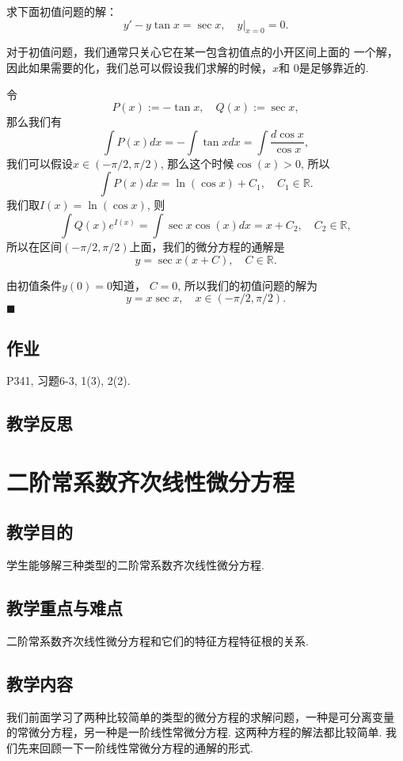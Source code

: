 \documentclass[a4paper, titlepage, twoside]{article}
\newenvironment{jie}{\noindent{\bf 解:}}{\hfill$\blacksquare$\par}
\numberwithin{equation}{section}
\begin{document}
\begin{example}[P341, 习题6-3, 2(1)]
	求下面初值问题的解：
	$$ y'-y\tan x =\sec x, \quad y|_{x=0}=0.$$
\end{example}
\begin{jie}
	对于初值问题，我们通常只关心它在某一包含初值点的小开区间上面的
	一个解，因此如果需要的化，我们总可以假设我们求解的时候，$x$和
	$0$是足够靠近的. 

	令
	$$ P(x) := -\tan x, \quad Q(x):= \sec x, $$
	那么我们有
	$$ \int P(x) dx = -\int \tan x dx = \int \frac{d\cos x}{\cos x}, $$
	我们可以假设$x\in (-\pi/2, \pi/2)$, 那么这个时候$\cos(x)>0$,  所以
	$$ \int P(x)dx=\ln(\cos x) + C_1, \quad C_1 \in \mathbb{R}.$$
	我们取$I(x)=\ln(\cos x)$, 则
	$$ \int Q(x) e^{I(x)} = \int \sec x \cos (x) dx =x + C_2, \quad C_2\in
	\mathbb{R}, $$
	所以在区间$(-\pi/2, \pi/2)$上面，我们的微分方程的通解是
	$$ y= \sec x ( x + C), \quad C\in \mathbb{R}.$$

	由初值条件$y(0)=0$知道， $C=0$, 所以我们的初值问题的解为
	$$ y=x\sec x, \quad x\in (-\pi/2, \pi/2).$$
\end{jie}

\subsection{作业}

P341, 习题6-3, 1(3), 2(2).
\subsection{教学反思}




\section{二阶常系数齐次线性微分方程}
\subsection{教学目的}
学生能够解三种类型的二阶常系数齐次线性微分方程. 
\subsection{教学重点与难点}
二阶常系数齐次线性微分方程和它们的特征方程特征根的关系. 
\subsection{教学内容}

我们前面学习了两种比较简单的类型的微分方程的求解问题，一种是可分离变量
的常微分方程，另一种是一阶线性常微分方程. 这两种方程的解法都比较简单. 
我们先来回顾一下一阶线性常微分方程的通解的形式. 
\end{document}
